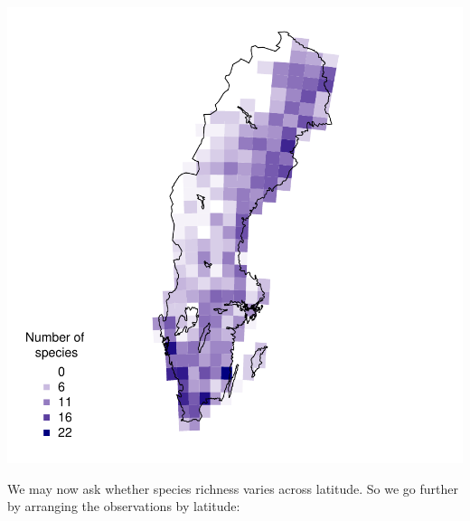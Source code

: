 \documentclass[
  10pt,
]{article}
\begin{document}
\includegraphics{r-tools-tutorial_files/figure-latex/gridPlot-1.pdf}

We may now ask whether species richness varies across latitude. So we go further by arranging the observations by latitude:
\end{document}
